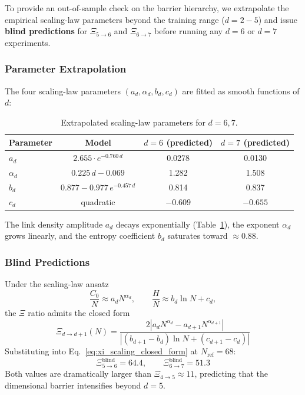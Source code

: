 \documentclass[12pt,a4paper]{article}
\begin{document}
To provide an out-of-sample check on the barrier hierarchy, we extrapolate the
empirical scaling-law parameters beyond the training range ($d = 2{-}5$) and issue
\textbf{blind predictions} for
$\Xi_{5 \to 6}$ and $\Xi_{6 \to 7}$ before running any $d = 6$ or $d = 7$ experiments.

\subsubsection{Parameter Extrapolation}
\label{sec:param_extrap}

The four scaling-law parameters $(a_d, \alpha_d, b_d, c_d)$ are fitted as smooth
functions of $d$:

\begin{table}[htbp]
\centering
\caption{Extrapolated scaling-law parameters for $d = 6, 7$.}
\label{tab:extrap_params}
\begin{tabular}{@{}lccc@{}}
\toprule
Parameter & Model & $d{=}6$ (predicted) & $d{=}7$ (predicted) \\
\midrule
$a_d$ & $2.655 \cdot e^{-0.760\,d}$ & 0.0278 & 0.0130 \\
$\alpha_d$ & $0.225\,d - 0.069$ & 1.282 & 1.508 \\
$b_d$ & $0.877 - 0.977\,e^{-0.457\,d}$ & 0.814 & 0.837 \\
$c_d$ & quadratic & $-0.609$ & $-0.655$ \\
\bottomrule
\end{tabular}
\end{table}

The link density amplitude $a_d$ decays exponentially (Table~\ref{tab:extrap_params}),
the exponent $\alpha_d$ grows linearly,
and the entropy coefficient $b_d$ saturates toward $\approx 0.88$.

\subsubsection{Blind Predictions}
\label{sec:blind_predictions}

Under the scaling-law ansatz
\begin{equation}
\frac{C_0}{N} \approx a_d N^{\alpha_d},
\qquad
\frac{H}{N} \approx b_d \ln N + c_d,
\end{equation}
the $\Xi$ ratio admits the closed form
\begin{equation}
\boxed{
\Xi_{d \to d+1}(N) =
\frac{2\left|a_d N^{\alpha_d} - a_{d+1} N^{\alpha_{d+1}}\right|}
{\left|(b_{d+1}-b_d)\ln N + (c_{d+1}-c_d)\right|}
}
\label{eq:xi_scaling_closed_form}
\end{equation}
Substituting into Eq.~\eqref{eq:xi_scaling_closed_form} at $N_\text{ref} = 68$:
\begin{equation}
\boxed{
\Xi_{5 \to 6}^{\text{blind}} = 64.4, \qquad \Xi_{6 \to 7}^{\text{blind}} = 51.3
}
\label{eq:blind_predictions}
\end{equation}
Both values are dramatically larger than $\Xi_{4 \to 5} \approx 11$,
predicting that the dimensional barrier intensifies beyond $d = 5$.
\end{document}
